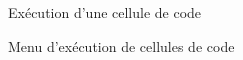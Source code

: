 \documentclass{article}
\begin{document}
\begin{figure}[H]
  \centering
  \caption{Exécution d'une cellule de code}
  \label{fig:code_run}
\end{figure}

\begin{figure}[H]
  \centering
  \caption{Menu d'exécution de cellules de code}
  \label{fig:runtime_menu}
\end{figure}
\end{document}
